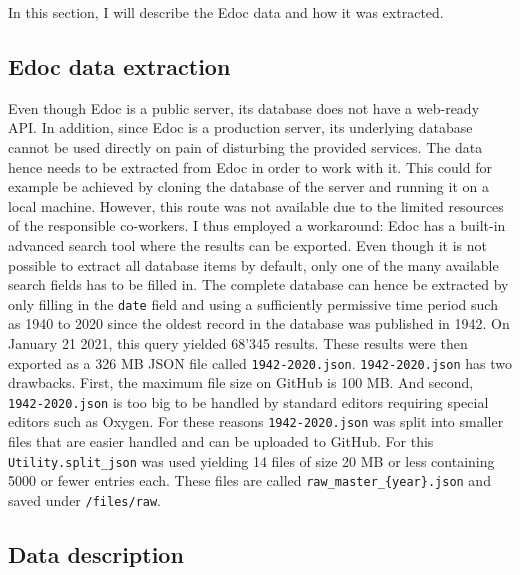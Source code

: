 In this section, I will describe the Edoc data and how it was extracted.

\hypertarget{edoc-data-extraction}{%
\subsection{Edoc data extraction}\label{edoc-data-extraction}}

Even though Edoc is a public server, its database does not have a
web-ready API. In addition, since Edoc is a production server, its
underlying database cannot be used directly on pain of disturbing the
provided services. The data hence needs to be extracted from Edoc in
order to work with it. This could for example be achieved by cloning the
database of the server and running it on a local machine. However, this
route was not available due to the limited resources of the responsible
co-workers. I thus employed a workaround: Edoc has a built-in advanced
search tool where the results can be exported. Even though it is not
possible to extract all database items by default, only one of the many
available search fields has to be filled in. The complete database can
hence be extracted by only filling in the \texttt{date} field and using
a sufficiently permissive time period such as 1940 to 2020 since the
oldest record in the database was published in 1942. On January 21 2021,
this query yielded 68'345 results. These results were then exported as a
326 MB JSON file called \texttt{1942-2020.json}. \texttt{1942-2020.json}
has two drawbacks. First, the maximum file size on GitHub is 100 MB. And
second, \texttt{1942-2020.json} is too big to be handled by standard
editors requiring special editors such as Oxygen. For these reasons
\texttt{1942-2020.json} was split into smaller files that are easier
handled and can be uploaded to GitHub. For this
\texttt{Utility.split\_json} was used yielding 14 files of size 20 MB or
less containing 5000 or fewer entries each. These files are called
\texttt{raw\_master\_\{year\}.json} and saved under \texttt{/files/raw}.

\hypertarget{data-description}{%
\subsection{Data description}\label{data-description}}

